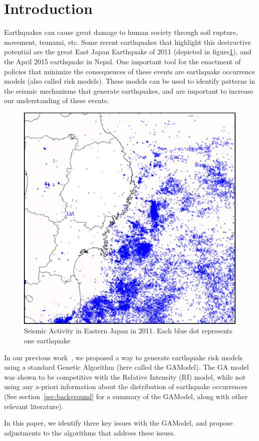 \section{Introduction}\label{intro}

Earthquakes can cause great damage to human society through soil
rupture, movement, tsunami, etc. Some recent earthquakes that
highlight this destructive potential are the great East Japan
Earthquake of 2011 (depicted in figure\ref{GreatEastJapan}), and the
April 2015 earthquake in Nepal. One important tool for the enactment
of policies that minimize the consequences of these events are
earthquake occurrence models (also called risk models). These models
can be used to identify patterns in the seismic mechanisms that
generate earthquakes, and are important to increase our understanding
of these events.


\begin{figure}[]
\centering
\includegraphics[width=.45\textwidth]{img/earthquakes2011.png}
\caption{Seismic Activity in Eastern Japan in 2011. Each blue dot
  represents one earthquake}
\label{GreatEastJapan}
\end{figure}

In our previous work~\cite{ecta14}, we proposed a way to generate
earthquake risk models using a standard Genetic Algorithm (here called
the GAModel). The GA model was shown to be competitive with the
Relative Intensity (RI) model, while not using any a-priori
information about the distribution of earthquake occurrences (See
section~\ref{sec:background} for a summary of the GAModel, along with
other relevant literature).

In this paper, we identify three key issues with the GAModel, and
propose adjustments to the algorithms that address these issues.

